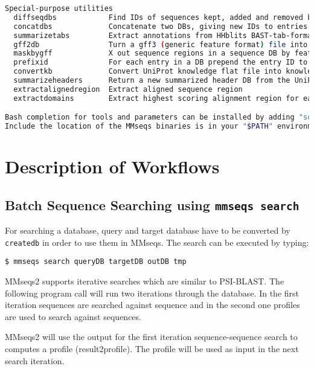 \documentclass[11pt,a4paper]{scrreprt}
\begin{document}
\begin{lstlisting}[language=bash, basicstyle=\footnotesize]
Special-purpose utilities
  diffseqdbs            Find IDs of sequences kept, added and removed between two versions of sequence DB
  concatdbs             Concatenate two DBs, giving new IDs to entries from second input DB
  summarizetabs         Extract annotations from HHblits BAST-tab-formatted results
  gff2db                Turn a gff3 (generic feature format) file into a gff3 DB
  maskbygff             X out sequence regions in a sequence DB by features in a gff3 file
  prefixid              For each entry in a DB prepend the entry ID to the entry itself
  convertkb             Convert UniProt knowledge flat file into knowledge DB for the selected column types
  summarizeheaders      Return a new summarized header DB from the UniProt headers of a cluster DB
  extractalignedregion  Extract aligned sequence region
  extractdomains        Extract highest scoring alignment region for each sequence from BLAST-tab file

Bash completion for tools and parameters can be installed by adding "source path/to/mmseqs/util/bash-completion.sh" to your "$HOME/.bash_profile".
Include the location of the MMseqs binaries is in your "$PATH" environment variable.
\end{lstlisting}
\section{Description of Workflows}
\subsection{Batch Sequence Searching using \texttt{mmseqs search}}

For searching a database, query and target database have to be converted by \texttt{createdb} in order to use them in MMseqs. The search can be executed by typing:

\begin{verbatim}
$ mmseqs search queryDB targetDB outDB tmp
\end{verbatim}

MMseqs2 supports iterative searches which are similar to PSI-BLAST.   The following program call will run two iterations through the database. In the first iteration sequences  are searched against sequence and in the second one profiles are used to search against sequences.

MMseqs2 will use the output for the first iteration sequence-sequence search to computes a profile (result2profile). The profile will be used as input in the next search iteration. 
\end{document}
